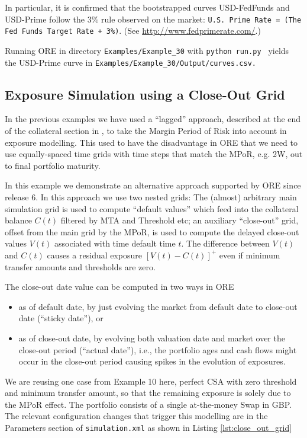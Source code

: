 In particular, it is confirmed that the bootstrapped curves USD-FedFunds and USD-Prime follow
the 3\% rule observed on the market: {\tt U.S. Prime Rate = (The Fed Funds Target Rate + 3\%)}.
(See \url{http://www.fedprimerate.com/}.)

Running ORE in directory {\tt Examples/Example\_30} with {\tt python run.py }
yields the USD-Prime curve in {\tt Examples/Example\_30/Output/curves.csv.}

\subsection{Exposure Simulation using a Close-Out Grid}%
\label{example:31}

In the previous examples we have used a ``lagged'' approach, described at the end of the collateral section in \cite{methods},
to take the Margin Period of Risk into account in exposure modelling. This used to have the disadvantage in ORE that we need
to use equally-spaced time grids with time steps that match the MPoR, e.g. 2W, out to final portfolio maturity.

In this example we demonstrate an alternative approach supported by ORE since release 6. In this approach we use two nested grids: The (almost) arbitrary main simulation grid is used to compute ``default values'' which feed into the collateral balance $C(t)$ filtered by MTA and Threshold etc; an auxiliary ``close-out'' grid, offset from the main grid by the MPoR, is used to compute the delayed close-out values $V(t)$ associated with time default time $t$. The difference between $V(t)$ and $C(t)$ causes a residual exposure $[V(t)-C(t)]^+$ even if minimum transfer amounts and thresholds are zero.

The close-out date value can be computed in two ways in ORE
\begin{itemize}
\item as of default date, by just evolving the market from default date to close-out date
   (``sticky date''), or
\item  as of close-out date, by evolving both valuation date and market over the
   close-out period (``actual date''), i.e., the portfolio ages and cash flows might occur
   in the close-out period causing spikes in the evolution of exposures.
\end{itemize}

We are reusing one case from Example 10 here, perfect CSA with zero threshold and
minimum transfer amount, so that the remaining exposure is solely due to the MPoR
effect. The portfolio consists of a single at-the-money Swap in GBP.
The relevant configuration changes that trigger this modelling are in the Parameters section of {\tt simulation.xml} as shown in Listing \ref{lst:close_out_grid}

